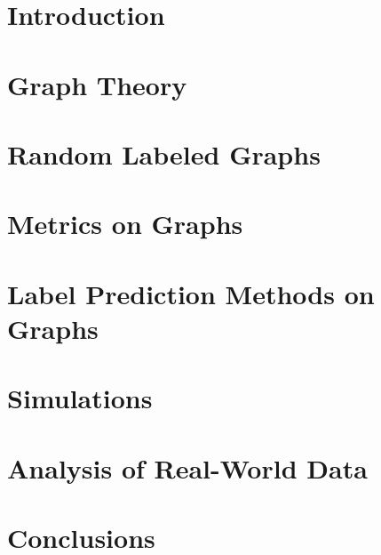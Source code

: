 \documentclass[11pt,oneside]{report}
\theoremstyle{definition}
\begin{document}
\chapter{Introduction}
\label{chap:intro}



\chapter{Graph Theory}
\label{chap:graph_theory}



\chapter{Random Labeled Graphs}
\label{chap:random_graphs}



\chapter{Metrics on Graphs}
\label{chap:metrics}



\chapter{Label Prediction Methods on Graphs}
\label{chap:prediction}



\chapter{Simulations}
\label{chap:simulations}



\chapter{Analysis of Real-World Data}
\label{chap:real_world}



\chapter{Conclusions}
\label{chap:conclusions}





\end{document}
